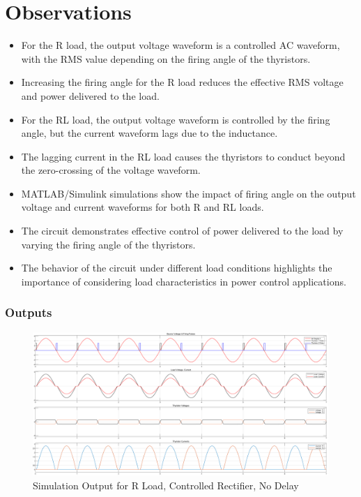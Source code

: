 \documentclass[12pt]{article}
\begin{document}
\section*{Observations}
\begin{itemize}
    \item For the R load, the output voltage waveform is a controlled AC waveform, with the RMS value depending on the firing angle of the thyristors.
    \item Increasing the firing angle for the R load reduces the effective RMS voltage and power delivered to the load.
    \item For the RL load, the output voltage waveform is controlled by the firing angle, but the current waveform lags due to the inductance.
    \item The lagging current in the RL load causes the thyristors to conduct beyond the zero-crossing of the voltage waveform.
    \item MATLAB/Simulink simulations show the impact of firing angle on the output voltage and current waveforms for both R and RL loads.
    \item The circuit demonstrates effective control of power delivered to the load by varying the firing angle of the thyristors.
    \item The behavior of the circuit under different load conditions highlights the importance of considering load characteristics in power control applications.
\end{itemize}


\subsubsection*{Outputs}
\begin{figure}[H]
    \centering
    \includegraphics[width=\textwidth]{1Rnd.png}
    \caption{Simulation Output for R Load, Controlled Rectifier, No Delay}
    \label{fig:rControlledNoDelay}
\end{figure}
\end{document}
